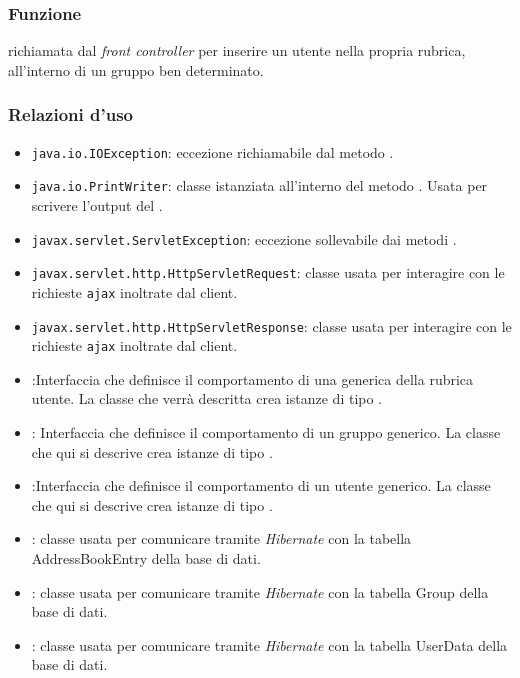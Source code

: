 \begin{description}
\end{description}



\subsubsection*{Funzione}
 richiamata dal \textit{front controller} per inserire un utente nella propria rubrica, all'interno di un gruppo ben determinato.

\subsubsection*{Relazioni d'uso}

\begin{itemize}
	\item \texttt{java.io.IOException}: eccezione richiamabile dal metodo .
	\item \texttt{java.io.PrintWriter}: classe istanziata all'interno del metodo . Usata per scrivere l'output del .
	\item \texttt{javax.servlet.ServletException}: eccezione sollevabile dai metodi .
	\item \texttt{javax.servlet.http.HttpServletRequest}: classe usata per interagire con le richieste \texttt{ajax} inoltrate dal client.
	\item \texttt{javax.servlet.http.HttpServletResponse}: classe usata per interagire con le richieste \texttt{ajax} inoltrate dal client.
	\item {}:Interfaccia che definisce il comportamento di una generica  della rubrica utente. La classe che verrà descritta crea istanze di tipo .
	\item {}:
Interfaccia che definisce il comportamento di un gruppo generico. La classe che qui si descrive crea istanze di tipo .
	\item {}:Interfaccia che definisce il comportamento di un utente generico. La classe che qui si descrive crea istanze di tipo .
	\item {}: classe usata per comunicare tramite \textit{Hibernate} con la tabella AddressBookEntry della base di dati.
	\item {}: classe usata per comunicare tramite \textit{Hibernate} con la tabella Group della base di dati.
	\item {}: classe usata per comunicare tramite \textit{Hibernate} con la tabella UserData della base di dati.
\end{itemize}

